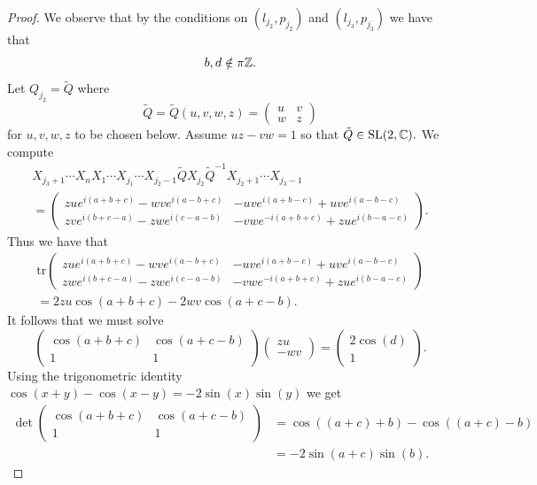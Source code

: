 \begin{proof}
We observe that by the conditions on $(l_{j_2},p_{j_2})$ and $(l_{j_3},p_{j_3})$ we have that 
$$b,d \notin \pi \mathbb{Z}.$$
Let $Q_{j_2}=\tilde Q$ where
$$ \tilde Q =  \tilde Q(u,v,w,z) =\begin{pmatrix} u & v
\\ w & z
\end{pmatrix}$$ for $u,v,w,z$ to be chosen below. Assume $uz-vw=1$ so that $\tilde Q\in \operatorname{SL}(2,\mathbb{C}).$ We compute
\begin{multline}
X_{{j_3}+1}\cdots X_n X_1\cdots X_{j_1} \cdots X_{j_2-1} \tilde QX_{j_2} \tilde Q^{-1} X_{j_2+1}\cdots X_{j_{3}-1} 
\\ = \begin{pmatrix} zue^{i(a+b+c)}-wve^{i(a-b+c)} & -uve^{i(a+b-c)}+uve^{i(a-b-c)}
\\ zve^{i(b+c-a)}-zwe^{i(c-a-b)} & -vwe^{-i(a+b+c)}+zue^{i(b-a-c)} \end{pmatrix}.
\end{multline}
Thus we have that
\begin{multline} \text{tr}\begin{pmatrix} zue^{i(a+b+c)}-wve^{i(a-b+c)} & -uve^{i(a+b-c)}+uve^{i(a-b-c)}
\\ zwe^{i(b+c-a)}-zwe^{i(c-a-b)} & -vwe^{-i(a+b+c)}+zue^{i(b-a-c)} \end{pmatrix}\\ =2zu\cos(a+b+c)-2wv\cos(a+c-b).
\end{multline}
It follows that we must solve
\begin{equation} \label{system}
\begin{pmatrix} \cos(a+b+c) & \cos(a+c-b)
\\ 1 & 1
\end{pmatrix} \begin{pmatrix} zu \\ -wv \end{pmatrix}=\begin{pmatrix} 2\cos(d) \\ 1 \end{pmatrix}.
\end{equation}
 Using the trigonometric identity $\cos(x+y) - \cos(x-y)=-2\sin(x)\sin(y)$ we get
 \begin{align}
 \det \begin{pmatrix} \cos(a+b+c) & \cos(a+c-b)
\\ 1 & 1
\end{pmatrix}&= \cos((a+c)+b)-\cos((a+c)-b)
\\ &=-2\sin(a+c)\sin(b).
 \end{align}

\end{proof}
